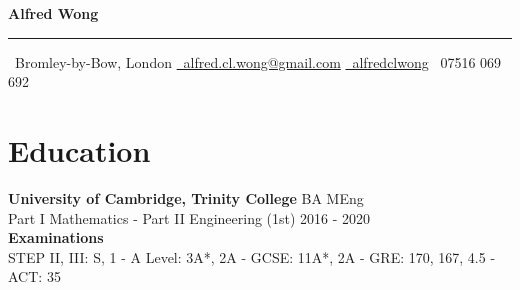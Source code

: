 \documentclass[letterpaper, 10pt]{article}
\begin{document}
\begin{center}
	{\bfseries\huge Alfred Wong}\\
	\vspace{-.5\baselineskip}\rule{\textwidth}{0.8pt}
	\faMapMarker\ Bromley-by-Bow, London
	\quad
	\href{mailto:alfred.cl.wong@gmail.com}{{\small\faEnvelope}\ alfred.cl.wong@gmail.com}
	\quad
	\href{https://github.com/alfredclwong}{\faGithub\ alfredclwong}
	\quad
	\faPhone\ 07516 069 692
\end{center}

\section*{Education}
\textbf{University of Cambridge, Trinity College} \hfill BA MEng\\
Part I Mathematics - Part II Engineering (1st) \hfill 2016 - 2020\vspace{.5\baselineskip}\\
\textbf{Examinations}\\
STEP II, III: S, 1 - A Level: 3A*, 2A - GCSE: 11A*, 2A - GRE: 170, 167, 4.5 - ACT: 35
\end{document}

